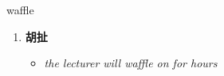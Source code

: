 
\begin{frame}
{\huge waffle}
\begin{center}
\begin{enumerate}\Large
  \item \textbf{胡扯}
  \begin{itemize}
    \item \em{\Large{the lecturer will waffle on for hours}}
  \end{itemize}
\end{enumerate}
\end{center}
\end{frame}
